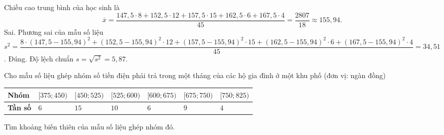 \begin{ex}
{\begin{itemchoice}
\begin{center}
\begin{tabular}
\hline
\end{tabular}
\end{center}
Chiều cao trung bình của học sinh là \\
\[\overline{x}=\dfrac{147{,}5 \cdot 8+152{,}5 \cdot 12+157{,}5 \cdot 15+162{,}5 \cdot 6+167{,}5 \cdot 4}{45}=\dfrac{2807}{18} \approx 155{,}94.\]
\itemch Sai. Phương sai của mẫu số liệu \\
$s^2=\dfrac{8 \cdot (147{,}5-155{,}94)^2+(152{,}5-155{,}94)^2 \cdot 12+(157{,}5-155{,}94)^2 \cdot 15+(162{,}5-155{,}94)^2 \cdot 6+(167{,}5-155{,}94)^2 \cdot 4}{45}=34{,}51$.
\itemch Đúng. Độ lệch chuẩn $ s=\sqrt{s^2}=5,87$.
\end{itemchoice}
}
\end{ex}

\begin{bt}%

Cho mẫu số liệu ghép nhóm số tiền điện phải trả trong một tháng của các hộ gia đình ở một khu phố (đơn vị: ngàn đồng)
\begin{center}
\begin{tabular}{|>{\centering\arraybackslash}m{2cm}|>{\centering\arraybackslash}m{2cm}|>{\centering\arraybackslash}m{2cm}|>{\centering\arraybackslash}m{2cm}|>{\centering\arraybackslash}m{2cm}|>{\centering\arraybackslash}m{2cm}|>{\centering\arraybackslash}m{2cm}|}
\hline
\textbf{Nhóm} & $[375;450)$ & $[450;525)$ & $[525;600)$ & $[600;675)$& $[675;750)$& $[750;825)$\\
\hline
\textbf{Tần số} & $6$ & $15$ & $10$ & $6$ & $9$ & $4$\\
\hline
\end{tabular}
\end{center}
Tìm khoảng biến thiên của mẫu số liệu ghép nhóm đó.
\end{bt}

